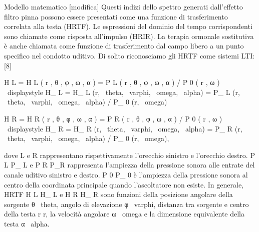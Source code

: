 {Modello matematico [modifica]
Questi indizi dello spettro generati dall'effetto filtro pinna possono essere presentati come una funzione di trasferimento correlata alla testa (HRTF). Le espressioni del dominio del tempo corrispondenti sono chiamate come risposta all'impulso (HRIR). La terapia ormonale sostitutiva è anche chiamata come funzione di trasferimento dal campo libero a un punto specifico nel condotto uditivo. Di solito riconosciamo gli HRTF come sistemi LTI: [8]

H
L
=
H
L
(
r
,
θ
,
φ
,
ω
,
α
)
=
P
L
(
r
,
θ
,
φ
,
ω
,
α
)
/
P
0
(
r
,
ω
)
{\ displaystyle H_ {L} = H_ {L} (r, \ theta, \ varphi, \ omega, \ alpha) = P_ {L} (r, \ theta, \ varphi, \ omega, \ alpha) / P_ { 0} (r, \ omega)}

H
R
=
H
R
(
r
,
θ
,
φ
,
ω
,
α
)
=
P
R
(
r
,
θ
,
φ
,
ω
,
α
)
/
P
0
(
r
,
ω
)
{\ displaystyle H_ {R} = H_ {R} (r, \ theta, \ varphi, \ omega, \ alpha) = P_ {R} (r, \ theta, \ varphi, \ omega, \ alpha) / P_ { 0} (r, \ omega)},

dove L e R rappresentano rispettivamente l'orecchio sinistro e l'orecchio destro.
P
L
P_ {L} e
P
R
P_R rappresenta l'ampiezza della pressione sonora alle entrate del canale uditivo sinistro e destro.
P
0
P_ {0} è l'ampiezza della pressione sonora al centro della coordinata principale quando l'ascoltatore non esiste. In generale, HRTF
H
L
H_ {L} e
H
R
H_ {R} sono funzioni della posizione angolare della sorgente
θ
\ theta, angolo di elevazione
φ
\ varphi, distanza tra sorgente e centro della testa
r
r, la velocità angolare
ω
\ omega e la dimensione equivalente della testa
α
\ alpha.

}
